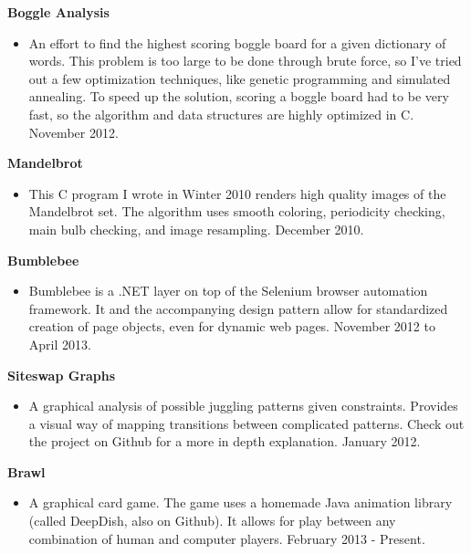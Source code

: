 \documentclass{res}
\begin{document}
\begin{resume}
{\bf Boggle Analysis}
       \begin{itemize}
        \item[] An effort to find the highest scoring boggle board for a given dictionary of words. This problem is too large to be done through brute force, so I've tried out a few optimization techniques, like genetic programming and simulated annealing. To speed up the solution, scoring a boggle board had to be very fast, so the algorithm and data structures are highly optimized in C. November 2012.

    \end{itemize}

  {\bf Mandelbrot}
        \begin{itemize}
        \item[] This C program I wrote in Winter 2010 renders high quality images of the Mandelbrot set. The algorithm uses smooth coloring, periodicity checking, main bulb checking, and image resampling. December 2010.

       \end{itemize}

  {\bf Bumblebee}
    \begin{itemize} %
      \item[] Bumblebee is a .NET layer on top of the Selenium browser automation framework. It and the accompanying design pattern allow for standardized creation of page objects, even for dynamic web pages. November 2012 to April 2013.

      \end{itemize}

   {\bf  Siteswap Graphs}
        \begin{itemize}
        \item[]  A graphical analysis of possible juggling patterns given constraints. Provides a visual way of mapping transitions between complicated patterns. Check out the project on Github for a more in depth explanation. January 2012.

       \end{itemize}

   {\bf Brawl}
        \begin{itemize}
        \item[] A graphical card game. The game uses a homemade Java animation library (called DeepDish, also on Github). It allows for play between any combination of human and computer players. February 2013 - Present.
        \end{itemize}
 
\end{resume}
\end{document}
